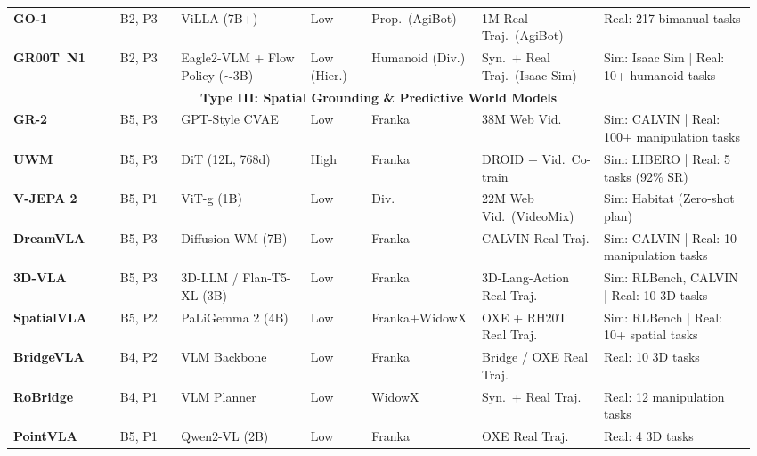 \documentclass[acmsmall,screen,review,anonymous]{acmart}
\begin{document}
\begin{table}[t!]
\begin{tabular}{
  p{0.14\linewidth}
  p{0.08\linewidth}
  p{0.17\linewidth}
  p{0.08\linewidth}
  p{0.13\linewidth}
  p{0.168\linewidth}
  p{0.205\linewidth}
}
\textbf{GO-1}~\cite{agibot2025} & B2, P3 & ViLLA (7B+) & Low & Prop.\ (AgiBot) & 1M Real Traj.\ (AgiBot) & Real: 217 bimanual tasks \\

\textbf{GR00T~N1}~\cite{nvidia2025grootn1} & B2, P3 & Eagle2-VLM + Flow Policy ($\sim$3B) & Low (Hier.) & Humanoid (Div.) & Syn.\ + Real Traj.\ (Isaac Sim) & Sim: Isaac Sim | Real: 10+ humanoid tasks \\

\midrule

\multicolumn{7}{c}{\textbf{Type III\@: Spatial Grounding \& Predictive World Models}} \\
\midrule

\textbf{GR-2}~\cite{cheang2024gr2} & B5, P3 & GPT-Style CVAE & Low & Franka & 38M Web Vid. & Sim: CALVIN | Real: 100+ manipulation tasks \\

\textbf{UWM}~\cite{zhu2025uwm} & B5, P3 & DiT (12L, 768d) & High & Franka & DROID + Vid.\ Co-train & Sim: LIBERO | Real: 5 tasks (92\% SR) \\

\textbf{V-JEPA 2}~\cite{assran2025vjepa} & B5, P1 & ViT-g (1B) & Low & Div. & 22M Web Vid.\ (VideoMix) & Sim: Habitat (Zero-shot plan) \\

\textbf{DreamVLA}~\cite{zhang2025dreamvla} & B5, P3 & Diffusion WM (7B) & Low & Franka & CALVIN Real Traj. & Sim: CALVIN | Real: 10 manipulation tasks \\

\textbf{3D-VLA}~\cite{zhen20243dvla} & B5, P3 & 3D-LLM / Flan-T5-XL (3B) & Low & Franka & 3D-Lang-Action Real Traj. & Sim: RLBench, CALVIN | Real: 10 3D tasks \\

\textbf{SpatialVLA}~\cite{qu2025spatialvla} & B5, P2 & PaLiGemma 2 (4B) & Low & Franka+WidowX & OXE + RH20T Real Traj. & Sim: RLBench | Real: 10+ spatial tasks \\

\textbf{BridgeVLA}~\cite{li2025bridgevla} & B4, P2 & VLM Backbone & Low & Franka & Bridge / OXE Real Traj. & Real: 10 3D tasks \\

\textbf{RoBridge}~\cite{zhang2025robridge} & B4, P1 & VLM Planner & Low & WidowX & Syn.\ + Real Traj. & Real: 12 manipulation tasks \\

\textbf{PointVLA}~\cite{li2026pointvla} & B5, P1 & Qwen2-VL (2B) & Low & Franka & OXE Real Traj. & Real: 4 3D tasks \\

\bottomrule
\end{tabular}
\end{table}
\end{document}
